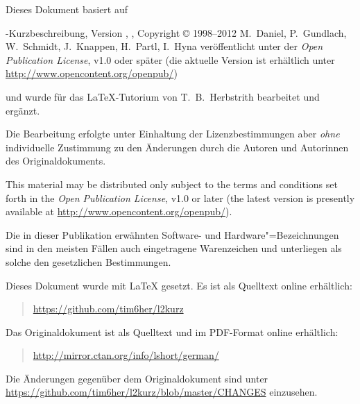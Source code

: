 {\parindent=0cm\thispagestyle{empty}

Dieses Dokument basiert auf
\bigskip

\sbLaTeXe-Kurzbeschreibung, Version \lkver, \lkdate, Copyright \copyright{} 1998--2012 M.~Daniel, P.~Gundlach, W.~Schmidt, J.~Knappen, H.~Partl, I.~Hyna veröffentlicht unter der \emph{Open Publication License}, v1.0 oder später (die aktuelle Version ist erhältlich unter
\url{http://www.opencontent.org/openpub/})
\bigskip

und wurde für das \LaTeX-Tutorium von T.~B.~Herbstrith bearbeitet und ergänzt.

Die Bearbeitung erfolgte unter Einhaltung der Lizenzbestimmungen aber \emph{ohne} individuelle Zustimmung zu den Änderungen durch die Autoren und Autorinnen des Originaldokuments.
\bigskip

{
This material may be distributed only subject to the terms and
conditions set forth in the \emph{Open Publication License}, v1.0 or
later (the latest version is presently available at
\url{http://www.opencontent.org/openpub/}).}


\bigskip

Die in dieser Publikation erwähnten Software- und Hardware"=Bezeichnungen sind
in den meisten Fällen auch eingetragene Warenzeichen und unterliegen als
solche den gesetzlichen Bestimmungen.

\bigskip

\vfill

Dieses Dokument wurde mit \LaTeX{} gesetzt.
Es ist als Quelltext online erhältlich:
\begin{quote}
\url{https://github.com/tim6her/l2kurz}
\end{quote}

\bigskip

Das Originaldokument ist als Quelltext und im PDF-Format online erhältlich:
\begin{quote}
\url{http://mirror.ctan.org/info/lshort/german/}
\end{quote}
Die Änderungen gegenüber dem Originaldokument sind unter \url{https://github.com/tim6her/l2kurz/blob/master/CHANGES} einzusehen.

}
